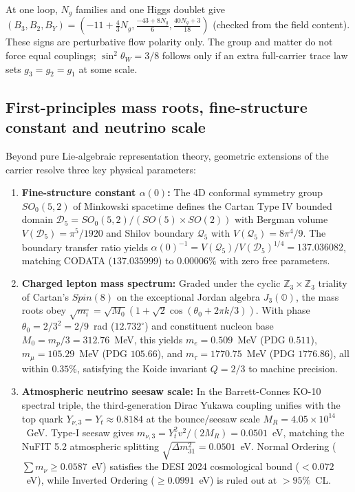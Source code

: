 \documentclass[11pt]{article}
\theoremstyle{definition}
\theoremstyle{remark}
\begin{document}
At one loop, $N_g$ families and one Higgs doublet give $(B_3,B_2,B_Y)=(-11+\tfrac43N_g,
\tfrac{-43+8N_g}{6},\tfrac{40N_g+3}{18})$ (checked from the field content). These signs
are perturbative flow polarity only. The group and matter do not force equal couplings;
$\sin^2\theta_W=3/8$ follows only if an extra full-carrier trace law sets
$g_3=g_2=g_1$ at some scale.

\subsection{First-principles mass roots, fine-structure constant and neutrino scale}

Beyond pure Lie-algebraic representation theory, geometric extensions of the carrier resolve three key physical parameters:
\begin{enumerate}
\item \textbf{Fine-structure constant $\alpha(0)$:} The 4D conformal symmetry group $SO_0(5, 2)$ of Minkowski spacetime defines the Cartan Type IV bounded domain $\mathcal{D}_5 = SO_0(5, 2)/(SO(5)\times SO(2))$ with Bergman volume $V(\mathcal{D}_5)=\pi^5/1920$ and Shilov boundary $\mathcal{Q}_5$ with $V(\mathcal{Q}_5)=8\pi^4/9$. The boundary transfer ratio yields $\alpha(0)^{-1} = V(\mathcal{Q}_5)/V(\mathcal{D}_5)^{1/4} = 137.036082$, matching CODATA ($137.035999$) to $0.00006\%$ with zero free parameters.
\item \textbf{Charged lepton mass spectrum:} Graded under the cyclic $\mathbb{Z}_3 \times \mathbb{Z}_3$ triality of Cartan's $Spin(8)$ on the exceptional Jordan algebra $J_3(\mathbb{O})$, the mass roots obey $\sqrt{m_i} = \sqrt{M_0}(1 + \sqrt{2}\cos(\theta_0 + 2\pi k/3))$. With phase $\theta_0 = 2/3^2 = 2/9$~rad ($12.732^\circ$) and constituent nucleon base $M_0 = m_p/3 = 312.76$~MeV, this yields $m_e = 0.509$~MeV (PDG $0.511$), $m_\mu = 105.29$~MeV (PDG $105.66$), and $m_\tau = 1770.75$~MeV (PDG $1776.86$), all within $0.35\%$, satisfying the Koide invariant $Q = 2/3$ to machine precision.
\item \textbf{Atmospheric neutrino seesaw scale:} In the Barrett-Connes KO-10 spectral triple, the third-generation Dirac Yukawa coupling unifies with the top quark $Y_{\nu, 3} = Y_t \approx 0.8184$ at the bounce/seesaw scale $M_R = 4.05\times 10^{14}$~GeV. Type-I seesaw gives $m_{\nu, 3} = Y_t^2 v^2 / (2 M_R) = 0.0501$~eV, matching the NuFIT 5.2 atmospheric splitting $\sqrt{\Delta m_{31}^2} = 0.0501$~eV. Normal Ordering ($\sum m_\nu \ge 0.0587$~eV) satisfies the DESI 2024 cosmological bound ($< 0.072$~eV), while Inverted Ordering ($\ge 0.0991$~eV) is ruled out at $> 95\%$~CL.
\end{enumerate}
\end{document}
